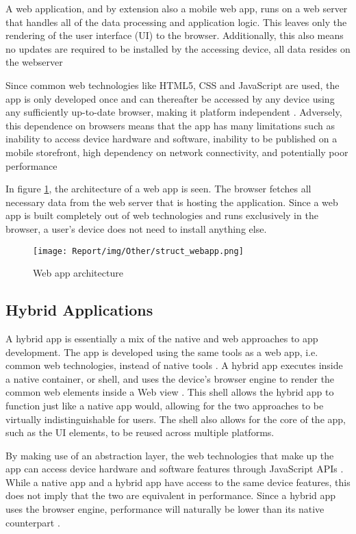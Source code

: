 \documentclass[a4paper,12pt]{article}
\begin{document}
A web application, and by extension also a mobile web app, runs on a web server that handles all of the data processing and application logic. This leaves only the rendering of the user interface (UI) to the browser. Additionally, this also means no updates are required to be installed by the accessing device, all data resides on the webserver \cite{crossplatform_taxonomy, crossplatform_2012}

Since common web technologies like HTML5, CSS and JavaScript are used, the app is only developed once and can thereafter be accessed by any device using any sufficiently up-to-date browser, making it platform independent \cite{crossplatform_taxonomy}. Adversely, this dependence on browsers means that the app has many limitations such as  inability to access device hardware and software, inability to be published on a mobile storefront, high dependency on network connectivity, and potentially poor performance \cite{crossplatform_taxonomy, crossplatform_2012}

In figure \ref{fig:webapp}, the architecture of a web app is seen. The browser fetches all necessary data from the web server that is hosting the application. Since a web app is built completely out of web technologies and runs exclusively in the browser, a user’s device does not need to install anything else.

\begin{figure}[h]%
	\centering
	\texttt{[image: Report/img/Other/struct\_webapp.png]}
	\caption{Web app architecture}%
	\label{fig:webapp}%
\end{figure}

\subsection{Hybrid Applications}
A hybrid app is essentially a mix of the native and web approaches to app development. The app is developed using the same tools as a web app, i.e. common web technologies, instead of native tools \cite{mobile_web_apps_2013}. A hybrid app executes inside a native container, or shell, and uses the device’s browser engine to render the common web elements inside a Web view \cite{crossplatform_2012}. This shell allows the hybrid app to function just like a native app would, allowing for the two approaches to be virtually indistinguishable for users. The shell also allows for the core of the app, such as the UI elements, to be reused across multiple platforms.

By making use of an abstraction layer, the web technologies that make up the app can access device hardware and software features through JavaScript APIs \cite{crossplatform_2012}. While a native app and a hybrid app have access to the same device features, this does not imply that the two are equivalent in performance. Since a hybrid app uses the browser engine, performance will naturally be lower than its native counterpart \cite{crossplatform_taxonomy, crossplatform_2012}.
\end{document}
